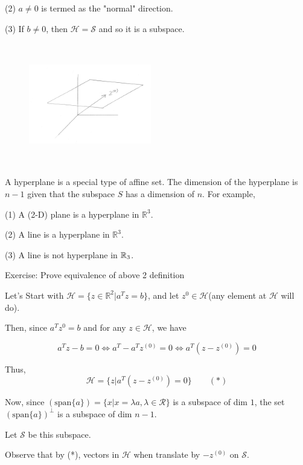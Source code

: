 (2) $a \neq 0$ is termed as the "normal" direction.

(3) If $b \neq 0$, then $\mathcal{H} = \mathcal{S}$ and so it is a subspace. 


\begin{figure}
	\centering
	\includegraphics[width=2.1in,height=2.1in]{figures/ch02/p35.jpg}
\end{figure}

A hyperplane is a special type of affine set. The dimension of the hyperplane is $n-1$ given that the subspace $S$ has a dimension of $n$. For example,

(1) A (2-D) plane is a hyperplane in $\mathbb{R}^3$. 

(2) A line is a hyperplane in $\mathbb{R}^3$. 

(3) A line is not hyperplane in $\mathbb{R}_{3}$.


\vspace{0.3cm}
Exercise: Prove equivalence of above 2 definition

Let's Start with $\mathcal{H} = \{z \in \mathbb{R}^2 | a^{T} z = b \}$, and let $z^{0} \in \mathcal{H}$(any element at $\mathcal{H}$ will do).

Then, since $a^{T} z^{0} = b$ and for any $z \in \mathcal{H}$, we have

$$a^{T} z - b = 0\Leftrightarrow a^{T} - a^{T}z^{(0)} = 0\Leftrightarrow a^{T} (z - z^{(0)}) = 0$$

Thus,
$$\mathcal{H} = \{z | a^{T} (z - z^{(0)}) = 0 \}     \qquad (*)$$

Now, since $(\text{span} \{ a \}) = \{ x | x= \lambda  a, \lambda \in \mathcal{R} \}$ is a subspace of dim $1$, the set $(\text{span} \{ a \})^{\perp} $ is a subspace of dim $n-1$. 

Let $\mathcal{S}$ be this subspace.

Observe that by (*), vectors in $\mathcal{H}$ when translate by $-z^{(0)}$ on $\mathcal{S}$. 

